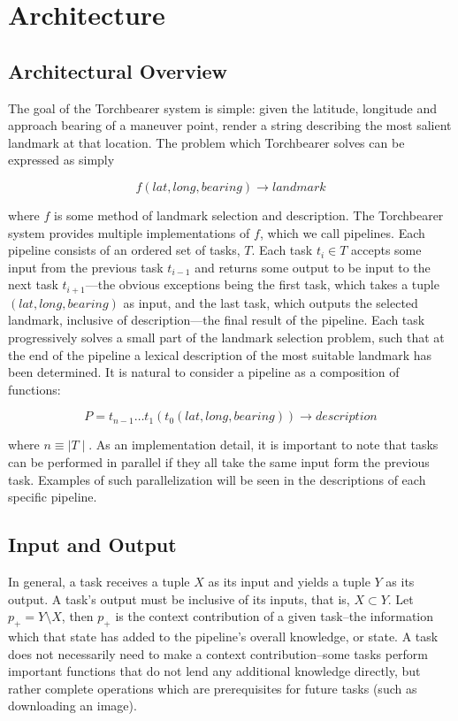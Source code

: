 \chapter{Architecture} \label{CH:architecture}

\section{Architectural Overview}\label{sec:arch:overview}
The goal of the Torchbearer system is simple: given the latitude, longitude and approach bearing of a maneuver point, render a string describing the most salient landmark at that location. The problem which Torchbearer solves can be expressed as simply

\begin{equation}\label{eq:problem}
    f(lat, long, bearing) \longrightarrow landmark
\end{equation}

where $f$ is some method of landmark selection and description. The Torchbearer system provides multiple implementations of $f$, which we call pipelines. Each pipeline consists of an ordered set of tasks, $T$. Each task $t_i \in T$ accepts some input from the previous task $t_{i-1}$ and returns some output to be input to the next task $t_{i+1}$---the obvious exceptions being the first task, which takes a tuple $(lat, long, bearing)$ as input, and the last task, which outputs the selected landmark, inclusive of description---the final result of the pipeline. Each task progressively solves a small part of the landmark selection problem, such that at the end of the pipeline a lexical description of the most suitable landmark has been determined. It is natural to consider a pipeline as a composition of functions:

\begin{equation}\label{eq:pipeline}
    P=t_{n-1} \dots t_1(t_0(lat, long, bearing)) \longrightarrow description
\end{equation}

where $n \equiv \mid T \mid$. As an implementation detail, it is important to note that tasks can be performed in parallel if they all take the same input form the previous task. Examples of such parallelization will be seen in the descriptions of each specific pipeline.

\section{Input and Output}\label{sec:arch:io}
In general, a task receives a tuple $X$ as its input and yields a tuple $Y$ as its output. A task’s output must be inclusive of its inputs, that is, $X \subset Y$. Let $p_+ = Y \setminus X$, then $p_+$ is the context contribution of a given task--the information which that state has added to the pipeline's overall knowledge, or state. A task does not necessarily need to make a context contribution--some tasks perform important functions that do not lend any additional knowledge directly, but rather complete operations which are  prerequisites for future tasks (such as downloading an image).

